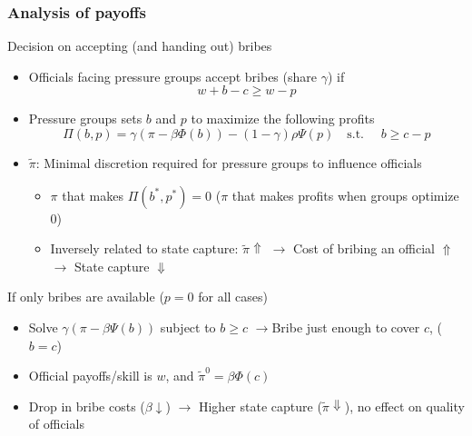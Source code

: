 \documentclass[aspectratio=169]{beamer}
\begin{document}
\begin{frame}
\frametitle{Analysis of payoffs} 
Decision on accepting (and handing out) bribes
\begin{itemize}\setlength\itemsep{3pt}
\item Officials facing pressure groups accept bribes (share $\gamma$) if \vspace{-5pt}
\[
w+b-c \geq w-p
\]
\vspace{-20pt}
\item Pressure groups sets $b$ and $p$ to maximize the following profits\vspace{-5pt}
\[
\Pi(b,p)=\gamma(\pi-\beta\Phi(b))-(1-\gamma)\rho\Psi(p) \quad \text{s.t.  }\quad b\geq c-p
\]
\vspace{-20pt}
\item $\tilde{\pi}$: Minimal discretion required for pressure groups to influence officials
\begin{itemize}\setlength\itemsep{3pt}
\item $\pi$ that makes $\Pi(b^*,p^*)=0$ ($\pi$ that makes profits when groups optimize $0$)
\item Inversely related to state capture: $\tilde{\pi}\Uparrow$ $\to$ Cost of bribing an official $\Uparrow$ $\to$ State capture  $\Downarrow$
\end{itemize}
\end{itemize}\medskip
If only bribes are available ($p=0$ for all cases)
\begin{itemize}\setlength\itemsep{3pt}
\item Solve $\gamma(\pi-\beta\Psi(b))$ subject to $b\geq c$ $\to$Bribe just enough to cover $c$, ($b=c$)
\item Official payoffs/skill is $w$, and $\tilde{\pi}^0=\beta\Phi(c)$
\item Drop in bribe costs ($\beta\downarrow$) $\to$ Higher state capture ($\tilde{\pi}\Downarrow$), no effect on quality of officials
\end{itemize}
\end{frame}
\end{document}
